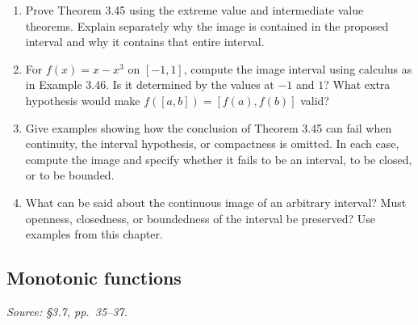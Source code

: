 \begin{enumerate}[resume]
  \item Prove Theorem 3.45 using the extreme value and intermediate
    value theorems. Explain separately why the image is contained
    in the proposed interval and why it contains that entire interval.

  \item For \(f(x)=x-x^3\) on \([-1,1]\), compute the image interval
    using calculus as in Example 3.46. Is it determined by the values
    at \(-1\) and \(1\)? What extra hypothesis would make
    \(f([a,b])=[f(a),f(b)]\) valid?

  \item Give examples showing how the conclusion of Theorem 3.45
    can fail when continuity, the interval hypothesis, or compactness
    is omitted. In each case, compute the image and specify whether
    it fails to be an interval, to be closed, or to be bounded.

  \item What can be said about the continuous image of an arbitrary
    interval? Must openness, closedness, or boundedness of the
    interval be preserved? Use examples from this chapter.
\end{enumerate}

\subsection{Monotonic functions}
\textit{Source: \S3.7, pp.~35--37.}


